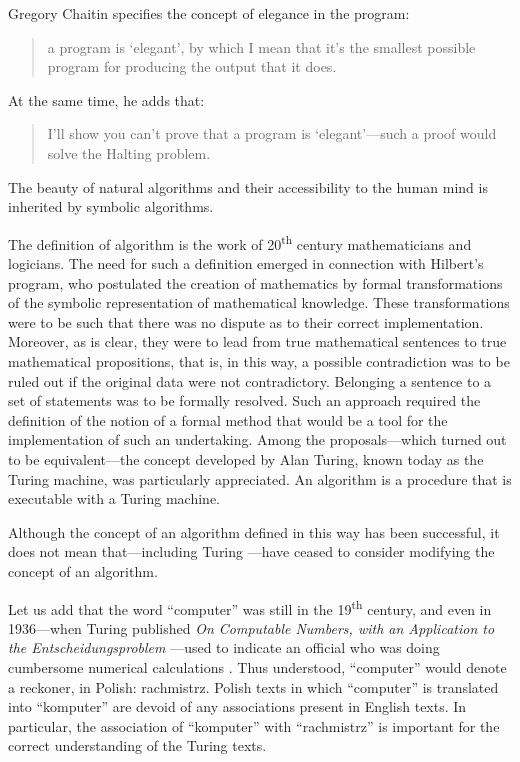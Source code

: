 \documentclass[pdftex,12pt]{article}
\begin{document}
Gregory Chaitin \parencite*[p.27] {Chaitin2005} specifies the concept of elegance in the program: \begin{quote} \small a program is `elegant', by which I mean that it's the smallest possible program for producing the output that it does. \end{quote} At the same time, he adds that: \begin{quote} \small I'll show you can't prove that a program is `elegant'---such a proof would solve the Halting problem. \end{quote}

The beauty of natural algorithms and their accessibility to the human mind is inherited by symbolic algorithms.


The definition of  algorithm is the work of 20\textsuperscript{th} century mathematicians and logicians. The need for such a definition emerged in connection with Hilbert's program, who postulated the creation of mathematics by formal transformations of the symbolic representation of mathematical knowledge. These transformations were to be such that there was no dispute as to their correct implementation. Moreover, as is clear, they were to lead from true mathematical sentences to true mathematical propositions, that is, in this way, a possible contradiction was to be ruled out if the original data were not contradictory. Belonging a sentence to a set of statements was to be formally resolved. Such an approach required the definition of the notion of a formal method that would be a tool for the implementation of such an undertaking. Among the proposals---which turned out to be equivalent---the concept developed by Alan Turing, known today as the Turing machine, was particularly appreciated. An algorithm is a procedure that is executable with a Turing machine.

Although the concept of an algorithm defined in this way has been successful, it does not mean that---including Turing \parencite*{Turing1950}---have ceased to consider modifying the concept of an algorithm.

Let us add that the word ``computer'' was still in the 19\textsuperscript{th} century, and even in 1936---when Turing published \emph{On Computable Numbers, with an Application to the {E}ntscheidungsproblem} \parencite*{Turing1936}---used to indicate an official who was doing cumbersome numerical calculations \parencite[p.446]{CopelandSprevakShagrir2017}. Thus understood, ``computer'' would denote a reckoner, in Polish: rachmistrz. Polish texts in which ``computer'' is translated into ``komputer'' are devoid of any associations present in English texts. In particular, the association of ``komputer'' with ``rachmistrz'' is important for the correct understanding of the  Turing texts.
\end{document}
